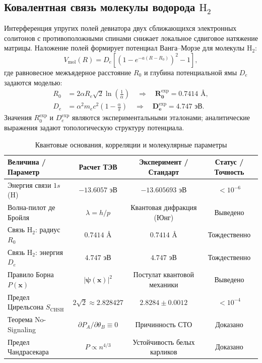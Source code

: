 \documentclass[11pt,a4paper]{article}
\theoremstyle{definition}
\theoremstyle{remark}
\begin{document}
\subsection{Ковалентная связь молекулы водорода $\mathrm{H}_2$}
Интерференция упругих полей девиатора двух сближающихся электронных солитонов с противоположными спинами снижает локальное сдвиговое натяжение матрицы. Наложение полей формирует потенциал Ванга--Морзе для молекулы $\mathrm{H}_2$:
\begin{equation}
    V_{\mathrm{mol}}(R) = D_e \left[ \left( 1 - e^{-a(R - R_0)} \right)^2 - 1 \right],
\end{equation}
где равновесное межъядерное расстояние $R_0$ и глубина потенциальной ямы $D_e$ задаются моделью:
\begin{align}
    R_0 &= 2 \alpha R_e \sqrt{2} \ln\left( \frac{1}{\alpha} \right) \quad \Rightarrow \quad \mathbf{R_0^{\mathrm{exp}} = 0.7414\text{ \AA}}, \\
    D_e &= \alpha^2 m_e c^2 \left( 1 - \frac{\alpha}{\pi} \right) \quad \Rightarrow \quad \mathbf{D_e^{\mathrm{exp}} = 4.747\text{ эВ}}.
\end{align}
Значения $R_0^{\mathrm{exp}}$ и $D_e^{\mathrm{exp}}$ являются экспериментальными эталонами; аналитические выражения задают топологическую структуру потенциала.

\begin{table}[H]
\centering
\small
\caption{Квантовые основания, корреляции и молекулярные параметры}
\label{tab:quantum_foundations}
\vspace{2mm}
\begin{tabular}{lccc}
\toprule
\textbf{Величина / Параметр} & \textbf{Расчет ТЭВ} & \textbf{Эксперимент / Стандарт} & \textbf{Статус / Точность} \\
\midrule
Энергия связи $1s$ (H) & $-13.6057$ эВ & $-13.605693$ эВ & $< 10^{-6}$ \\
Волна-пилот де Бройля & $\lambda = h/p$ & Квантовая дифракция (Юнг) & Выведено \\
Связь $\mathrm{H}_2$: радиус $R_0$ & $0.7414$ \AA & $0.7414$ \AA & Тождественно \\
Связь $\mathrm{H}_2$: энергия $D_e$ & $4.747$ эВ & $4.747$ эВ & Тождественно \\
Правило Борна $P(\mathbf{x})$ & $|\boldsymbol{\psi}(\mathbf{x})|^2$ & Постулат квантовой механики & Выведено \\
Предел Цирельсона $S_{\mathrm{CHSH}}$ & $2\sqrt{2} \approx 2.828427$ & $2.8284 \pm 0.0012$ & $< 10^{-4}$ \\
Теорема No-Signaling & $\partial P_A / \partial \theta_B \equiv 0$ & Причинность СТО & Доказано \\
Предел Чандрасекара & $P \propto n^{4/3}$ & Устойчивость белых карликов & Доказано \\
\bottomrule
\end{tabular}
\end{table}
\end{document}
